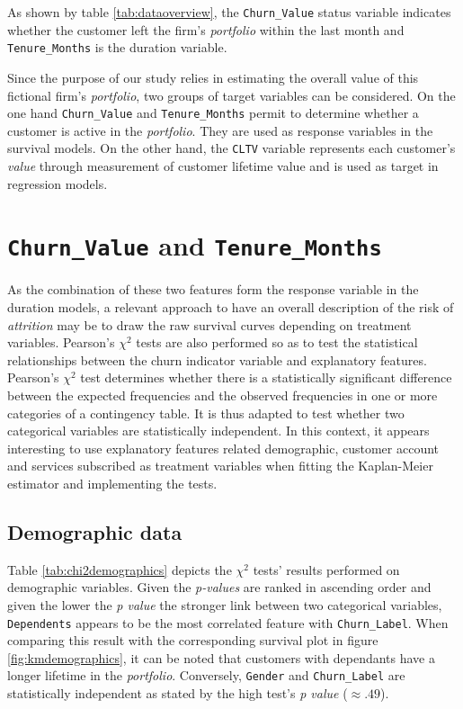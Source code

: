 \documentclass[
]{book}
\begin{document}
As shown by table \ref{tab:dataoverview}, the \texttt{Churn\_Value} status variable indicates whether the customer left the firm's \emph{portfolio} within the last month and \texttt{Tenure\_Months} is the duration variable.

Since the purpose of our study relies in estimating the overall value of this fictional firm's \emph{portfolio}, two groups of target variables can be considered. On the one hand \texttt{Churn\_Value} and \texttt{Tenure\_Months} permit to determine whether a customer is active in the \emph{portfolio}. They are used as response variables in the survival models. On the other hand, the \texttt{CLTV} variable represents each customer's \emph{value} through measurement of customer lifetime value and is used as target in regression models.

\hypertarget{churndescstats}{%
\section{\texorpdfstring{\texttt{Churn\_Value} and \texttt{Tenure\_Months}}{Churn\_Value and Tenure\_Months}}\label{churndescstats}}

As the combination of these two features form the response variable in the duration models, a relevant approach to have an overall description of the risk of \emph{attrition} may be to draw the raw survival curves depending on treatment variables. Pearson's \(\chi^2\) tests are also performed so as to test the statistical relationships between the churn indicator variable and explanatory features. Pearson's \(\chi^2\) test determines whether there is a statistically significant difference between the expected frequencies and the observed frequencies in one or more categories of a contingency table. It is thus adapted to test whether two categorical variables are statistically independent. In this context, it appears interesting to use explanatory features related demographic, customer account and services subscribed as treatment variables when fitting the Kaplan-Meier estimator and implementing the tests.

\hypertarget{demographic-data}{%
\subsection*{Demographic data}\label{demographic-data}}

Table \ref{tab:chi2demographics} depicts the \(\chi^2\) tests' results performed on demographic variables. Given the \emph{p-values} are ranked in ascending order and given the lower the \emph{p value} the stronger link between two categorical variables, \texttt{Dependents} appears to be the most correlated feature with \texttt{Churn\_Label}. When comparing this result with the corresponding survival plot in figure \ref{fig:kmdemographics}, it can be noted that customers with dependants have a longer lifetime in the \emph{portfolio}. Conversely, \texttt{Gender} and \texttt{Churn\_Label} are statistically independent as stated by the high test's \emph{p value} (\(\approx .49\)).
\end{document}
